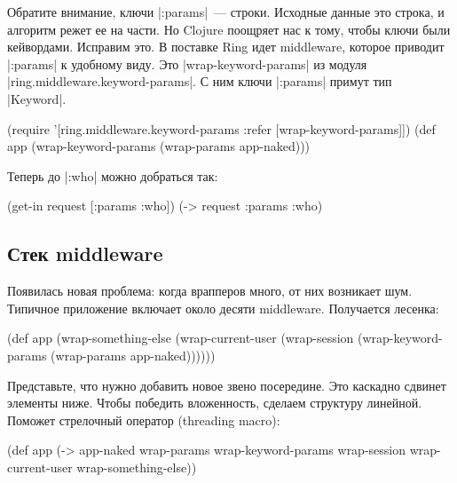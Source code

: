 Обратите внимание, ключи \spverb|:params|~--- строки. Исходные данные это
строка, и алгоритм режет ее на части. Но Clojure поощряет нас к тому, чтобы
ключи были кейвордами. Исправим это. В поставке Ring идет middleware, которое
приводит \spverb|:params| к удобному виду. Это \spverb|wrap-keyword-params| из
модуля \spverb|ring.middleware.keyword-params|. С ним ключи \spverb|:params|
примут тип \spverb|Keyword|.

\begin{english}
  \begin{clojure}
(require '[ring.middleware.keyword-params
           :refer [wrap-keyword-params]])
(def app (wrap-keyword-params (wrap-params app-naked)))
  \end{clojure}
\end{english}

Теперь до \spverb|:who| можно добраться так:

\begin{english}
  \begin{clojure}
(get-in request [:params :who])
(-> request :params :who)
  \end{clojure}
\end{english}

\subsection{Стек middleware}

Появилась новая проблема: когда врапперов много, от них возникает шум. Типичное
приложение включает около десяти middleware. Получается лесенка:

\begin{english}
  \begin{clojure}
(def app
  (wrap-something-else
    (wrap-current-user
      (wrap-session
        (wrap-keyword-params
          (wrap-params app-naked))))))
  \end{clojure}
\end{english}

Представьте, что нужно добавить новое звено посередине. Это каскадно сдвинет
элементы ниже. Чтобы победить вложенность, сделаем структуру линейной. Поможет
стрелочный оператор (threading macro):

\begin{english}
  \begin{clojure}
(def app
  (-> app-naked
      wrap-params
      wrap-keyword-params
      wrap-session
      wrap-current-user
      wrap-something-else))
  \end{clojure}
\end{english}

